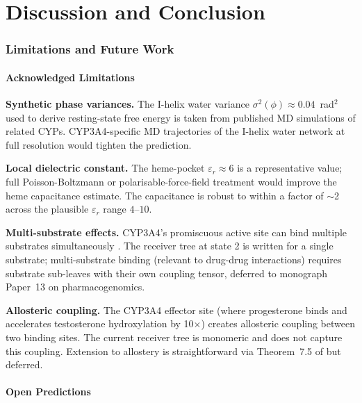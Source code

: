 \documentclass[11pt,twocolumn,a4paper]{article}
\theoremstyle{definition}
\theoremstyle{remark}
\begin{document}
\part{Discussion and Conclusion}

\section{Limitations and Future Work}
\label{sec:limits}

\subsection{Acknowledged Limitations}

\textbf{Synthetic phase variances.} The I-helix water variance $\sigma^2(\phi) \approx 0.04$~rad$^2$ used to derive resting-state free energy is taken from published MD simulations of related CYPs. CYP3A4-specific MD trajectories of the I-helix water network at full resolution would tighten the prediction.

\textbf{Local dielectric constant.} The heme-pocket $\varepsilon_r \approx 6$ is a representative value; full Poisson-Boltzmann or polarisable-force-field treatment would improve the heme capacitance estimate. The capacitance is robust to within a factor of $\sim$2 across the plausible $\varepsilon_r$ range $4$--$10$.

\textbf{Multi-substrate effects.} CYP3A4's promiscuous active site can bind multiple substrates simultaneously \citep{denisov2007}. The receiver tree at state 2 is written for a single substrate; multi-substrate binding (relevant to drug-drug interactions) requires substrate sub-leaves with their own coupling tensor, deferred to monograph Paper~13 on pharmacogenomics.

\textbf{Allosteric coupling.} The CYP3A4 effector site (where progesterone binds and accelerates testosterone hydroxylation by 10$\times$) creates allosteric coupling between two binding sites. The current receiver tree is monomeric and does not capture this coupling. Extension to allostery is straightforward via Theorem~7.5 of \citep{sachikonye2025_landscape} but deferred.

\subsection{Open Predictions}
\end{document}
